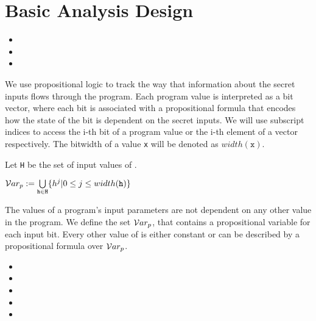 \begin{definition}

    
\end{definition}

\section{Basic Analysis Design}

\begin{itemize}
    \item {}
    \item {}
    \item {}
\end{itemize}

We use propositional logic to track the way that information about the secret inputs flows through the program. Each program value is interpreted as a bit vector, where each bit is associated with a propositional formula that encodes how the state of the bit is dependent on the secret inputs. We will use subscript indices to access the i-th bit of a program value or the i-th element of a vector respectively. The bitwidth of a value \texttt{x} will be denoted as $width(\mathtt{x})$.

\begin{definition}
    Let \texttt{H} be the set of input values of \pp.
    \begin{center}
        $\mathcal{V}ar_p := \bigcup\limits_{\mathtt{h} \in \mathtt{H}} \{h^j | 0 \leq j \leq width(\mathtt{h})\}$
    \end{center}
    The values of a program's input parameters are not dependent on any other value in the program. We define the set $\mathcal{V}ar_p$, that contains a propositional variable for each input bit. Every other value of \p is either constant or can be described by a propositional formula over $\mathcal{V}ar_p$.
\end{definition}

\textbf{}

\begin{itemize}
    \item {}
    \item {}
    \item {} 
    \item {}
    \item {}
\end{itemize}

